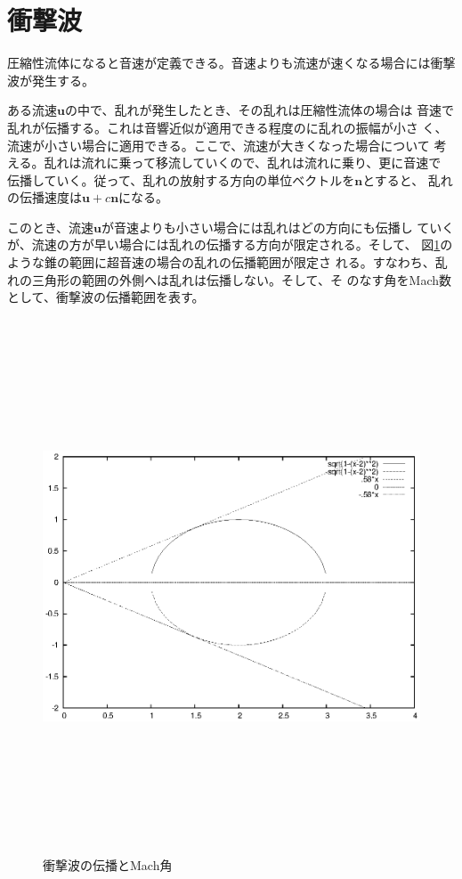 \section{衝撃波}
圧縮性流体になると音速が定義できる。音速よりも流速が速くなる場合には衝撃
波が発生する。

ある流速$\bm{u}$の中で、乱れが発生したとき、その乱れは圧縮性流体の場合は
音速で乱れが伝播する。これは音響近似が適用できる程度のに乱れの振幅が小さ
く、流速が小さい場合に適用できる。ここで、流速が大きくなった場合について
考える。乱れは流れに乗って移流していくので、乱れは流れに乗り、更に音速で
伝播していく。従って、乱れの放射する方向の単位ベクトルを$\bm{n}$とすると、
乱れの伝播速度は$\bm{u}+c\bm{n}$になる。

このとき、流速$\bm{u}$が音速よりも小さい場合には乱れはどの方向にも伝播し
ていくが、流速の方が早い場合には乱れの伝播する方向が限定される。そして、
図\ref{fig_shock}のような錐の範囲に超音速の場合の乱れの伝播範囲が限定さ
れる。すなわち、乱れの三角形の範囲の外側へは乱れは伝播しない。そして、そ
のなす角をMach数として、衝撃波の伝播範囲を表す。

\begin{figure}[htbp]
\begin{center}
 \includegraphics[width=450pt,height=450pt,angle=0]{shock.eps}
 \caption{衝撃波の伝播とMach角}
 \label{fig_shock}
 \end{center}
\end{figure}

